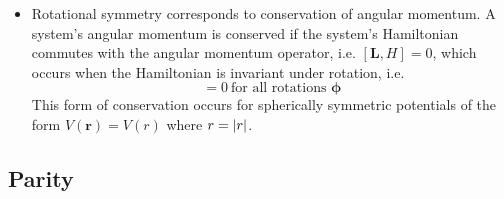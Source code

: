 \documentclass[11pt, a4paper]{article}
\newcommand{\Ham}{Hamiltonian\xspace}
\renewcommand{\vec}[1]{\bm{#1}}  %
\renewcommand{\r}{\vec{r}}  %
\begin{document}
\begin{itemize}
	\item Rotational symmetry corresponds to conservation of angular momentum. A system's angular momentum is conserved if the system's Hamiltonian commutes with the angular momentum operator, i.e. $ [\vec{L}, H] = 0 $, which occurs when the \Ham is invariant under rotation, i.e.
	\begin{equation*}
		[U(\vec{\phi}), H] = 0 \ \text{for all rotations } \vec{\phi}
	\end{equation*}
	This form of conservation occurs for spherically symmetric potentials of the form $ V(\r) = V(r) $ where $ r = \abs{r} $. 
\end{itemize}

\subsection{Parity}
\end{document}
